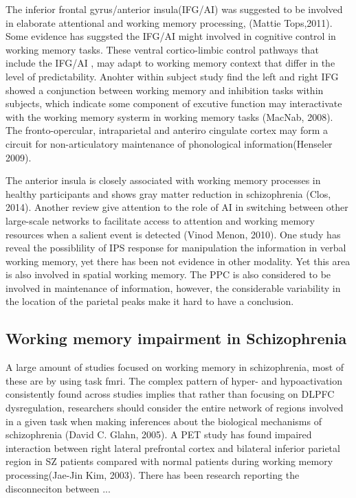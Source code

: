 \documentclass[preprint,authoryear,review,12pt]{elsarticle}
\begin{document}
The inferior frontal gyrus/anterior insula(IFG/AI) was suggested to be involved in elaborate attentional and working memory processing,  (Mattie Tops,2011). Some evidence has suggsted the IFG/AI might involved in cognitive control in working memory tasks. These ventral cortico-limbic control pathways that include the IFG/AI , may adapt to working memory context that differ in the level of predictability. Anohter within subject study find the left and right IFG showed a conjunction between working memory and inhibition tasks within subjects, which indicate some component of excutive function may interactivate with the working memory systerm in working memory tasks (MacNab, 2008). The fronto-opercular, intraparietal and anteriro cingulate cortex may form a circuit for non-articulatory maintenance of phonological information(Henseler 2009).  

The anterior insula is closely associated with working memory processes in healthy participants and shows gray matter reduction in schizophrenia (Clos, 2014). Another review give attention to the role of AI in switching between other large-scale networks to facilitate access to attention and working memory resources when a salient event is detected (Vinod Menon, 2010). One study has reveal the possiblility of IPS response for manipulation the information in verbal working memory, yet there has been not evidence in other modality. Yet this area is also involved in spatial working memory. The PPC is also considered to be involved in maintenance of information, however, the considerable variability in the location of the parietal peaks make it hard to have a conclusion.



\subsection*{Working memory impairment in Schizophrenia}


A large amount of studies focused on working memory in schizophrenia, most of these are by using task fmri.  The complex pattern of hyper- and hypoactivation consistently found across studies implies that rather than focusing on DLPFC dysregulation, researchers should consider the entire network of regions involved in a given task when making inferences about the biological mechanisms of schizophrenia (David C. Glahn, 2005). A PET study has found impaired interaction between right lateral prefrontal cortex and bilateral inferior parietal region in SZ patients compared with normal patients during working memory processing(Jae-Jin Kim, 2003). There has been research reporting the disconneciton between ...
\end{document}
